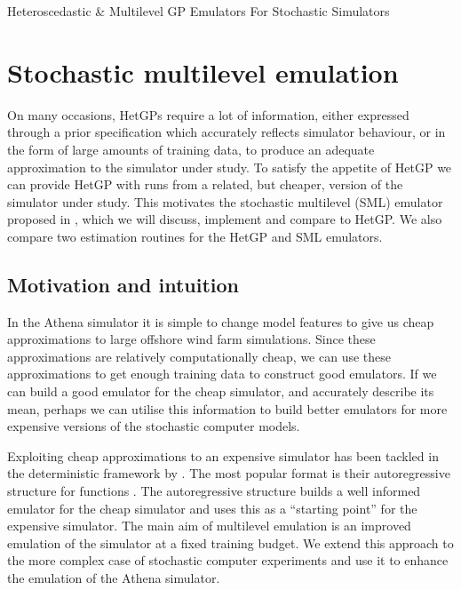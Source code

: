 \begin{chapter}{Heteroscedastic \& Multilevel GP Emulators For Stochastic Simulators\label{Ch:Hetsml}}
\section{Stochastic multilevel emulation\label{sec:SML}}
On many occasions, HetGPs require a lot of information, either expressed through a prior specification which accurately reflects simulator behaviour, or in the form of large amounts of training data, to produce an adequate approximation to the simulator under study. To satisfy the appetite of HetGP we can provide HetGP with runs from a related, but cheaper, version of the simulator under study. This motivates the stochastic multilevel (SML) emulator proposed in \citet{Kennedy2023}, which we will discuss, implement and compare to HetGP. We also compare two estimation routines for the HetGP and SML emulators.
\subsection{Motivation and intuition}
In the Athena simulator it is simple to change model features to give us cheap approximations to large offshore wind farm simulations. Since these approximations are relatively computationally cheap, we can use these approximations to get enough training data to construct good emulators. If we can build a good emulator for the cheap simulator, and accurately describe its mean, perhaps we can utilise this information to build better emulators for more expensive versions of the stochastic computer models.

Exploiting cheap approximations to an expensive simulator has been tackled in the deterministic framework by \citet{Kennedy2000}. The most popular format is their autoregressive structure for functions \citep{Forrester2007, Singh2017, Harvey2018}. The autoregressive structure builds a well informed emulator for the cheap simulator and uses this as a ``starting point'' for the expensive simulator. The main aim of multilevel emulation is an improved emulation of the simulator at a fixed training budget. We extend this approach to the more complex case of stochastic computer experiments and use it to enhance the emulation of the Athena simulator.


\end{chapter}
